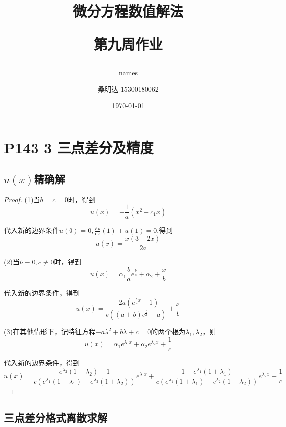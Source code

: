 \documentclass{article}%
\author{names}
\title{\heiti 微分方程数值解法\\ [2ex] \begin{large} 第九周作业 \end{large}}
\author{\kaishu 桑明达 15300180062}
\date{\today}
\begin{document}
\maketitle


\section{P143 3 三点差分及精度}

\subsection{$u(x)$精确解}
\begin{proof}
	(1)当$b=c=0$时，得到$$ u\left ( x \right )=-\frac{1}{a}\left ( x^{2}+c_1x \right ) $$

	代入新的边界条件$ u\left ( 0 \right )=0,\frac{\mathrm{d}u}{\mathrm{d}x}\left ( 1 \right )+u\left ( 1 \right )=0 $,得到$$ u\left ( x \right )=\frac{x\left ( 3-2x \right )}{2a} $$

	(2)当$b=0,c\neq 0$时，得到$$ u\left ( x \right )=\alpha _1\frac{b}{a}e^{\frac{b}{a}}+\alpha _2+\frac{x}{b} $$

	代入新的边界条件，得到$$ u\left ( x \right )=\frac{-2a\left ( e^{\frac{b}{a}x}-1 \right )}{b\left (\left ( a+b \right )e^{\frac{b}{a}}-a  \right )}+\frac{x}{b} $$

	(3)在其他情形下，记特征方程$ -a\lambda ^2+b\lambda+c=0 $的两个根为$ \lambda_1,\lambda_2 $，则$$ u\left ( x \right )=\alpha_1e^{\lambda_1x}+\alpha_2e^{\lambda_2x}+\frac{1}{c} $$

	代入新的边界条件，得到$$ u\left ( x \right )=\frac{e^{\lambda_2}\left ( 1+\lambda_2 \right )-1}{c\left ( e^{\lambda_1}\left ( 1+\lambda_1 \right )-e^{\lambda_2}\left ( 1+\lambda_2 \right ) \right )}e^{\lambda_1x}+\frac{1-e^{\lambda_1}\left ( 1+\lambda_1 \right )}{c\left ( e^{\lambda_1}\left ( 1+\lambda_1 \right )-e^{\lambda_2}\left ( 1+\lambda_2 \right ) \right )}e^{\lambda_2x}+\frac{1}{c} $$

\end{proof}

\subsection{三点差分格式离散求解}
\end{document}
